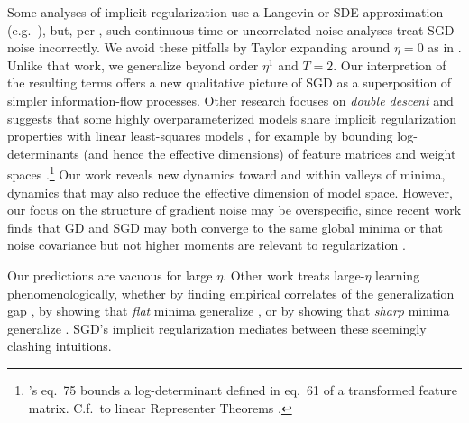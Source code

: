            Some analyses of implicit regularization use a Langevin or SDE
            approximation (e.g.\ \citet{ch18,zh19}), but, per \citet{ya19a},
            such continuous-time or uncorrelated-noise analyses treat SGD noise
            incorrectly.
            We avoid these pitfalls by Taylor expanding around $\eta=0$ as in
            \citet{ro18}.  Unlike that work, we generalize beyond order $\eta^1$
            and $T=2$.  %
            Our interpretion of the resulting
            terms offers a new qualitative picture of SGD as a superposition of
            simpler information-flow processes.
            Other research focuses on \emph{double descent} and suggests that
            some highly overparameterized models share implicit regularization
            properties with linear least-squares models \citep{be19}, for
            example by bounding log-determinants (and hence the effective
            dimensions) of feature matrices and weight spaces
            \citep{me20}.\footnote{
                \cite{me20}'s eq.\ 75 bounds a log-determinant defined in eq.\
                61 of a transformed feature matrix.  C.f.\ to linear
                Representer Theorems \citep{mo18b}.
            }
%
            Our work reveals new dynamics toward and within valleys of minima,
            dynamics that may also reduce the effective dimension of model space.
            However, our focus on the structure of gradient noise may be
            overspecific, since recent work finds that GD and SGD may both
            converge to the same global minima \citep{zo20} or that
            noise covariance but not higher moments are relevant to
            regularization \citep{wu20}. 

        
            Our predictions are vacuous for large $\eta$.  Other work treats
            large-$\eta$ learning phenomenologically, whether by finding
            empirical correlates of the generalization gap \citep{li18}, by
            showing that \emph{flat} minima generalize \citep{ho17,ke17,wa18},
            or by showing that \emph{sharp} minima generalize
            \citep{st56,di17,wu18}.  SGD's implicit regularization mediates
            between these seemingly clashing intuitions.
            
